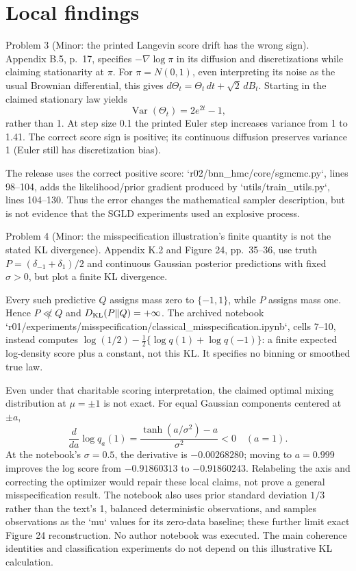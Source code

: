 \documentclass[10pt]{article}
\begin{document}
\section*{Local findings}
Problem 3 (Minor: the printed Langevin score drift has the wrong sign).  Appendix B.5, p. 17, specifies \(-\nabla\log\pi\) in its diffusion and discretizations while claiming stationarity at \(\pi\). For \(\pi=N(0,1)\), even interpreting its noise as the usual Brownian differential, this gives \(d\Theta_t=\Theta_t\,dt+\sqrt2\,dB_t\). Starting in the claimed stationary law yields \[\operatorname{Var}(\Theta_t)=2e^{2t}-1,\] rather than 1. At step size 0.1 the printed Euler step increases variance from 1 to 1.41. The correct score sign is positive; its continuous diffusion preserves variance 1 (Euler still has discretization bias).\par
The release uses the correct positive score: `r02/bnn\_hmc/core/sgmcmc.py`, lines 98–104, adds the likelihood/prior gradient produced by `utils/train\_utils.py`, lines 104–130. Thus the error changes the mathematical sampler description, but is not evidence that the SGLD experiments used an explosive process.\par
Problem 4 (Minor: the misspecification illustration’s finite quantity is not the stated KL divergence).  Appendix K.2 and Figure 24, pp. 35–36, use truth \(P=(\delta_{-1}+\delta_1)/2\) and continuous Gaussian posterior predictions with fixed \(\sigma>0\), but plot a finite KL divergence.\par
Every such predictive \(Q\) assigns mass zero to \(\{-1,1\}\), while \(P\) assigns mass one. Hence \(P\not\ll Q\) and \(D_{\rm KL}(P\|Q)=+\infty\). The archived notebook `r01/experiments/misspecification/classical\_misspecification.ipynb`, cells 7–10, instead computes \(\log(1/2)-\tfrac12\{\log q(1)+\log q(-1)\}\): a finite expected log-density score plus a constant, not this KL. It specifies no binning or smoothed true law.\par
Even under that charitable scoring interpretation, the claimed optimal mixing distribution at \(\mu=\pm1\) is not exact. For equal Gaussian components centered at \(\pm a\), \[\frac{d}{da}\log q_a(1)
=\frac{\tanh(a/\sigma^2)-a}{\sigma^2}<0\quad(a=1).\] At the notebook’s \(\sigma=0.5\), the derivative is \(-0.00268280\); moving to \(a=0.999\) improves the log score from \(-0.91860313\) to \(-0.91860243\). Relabeling the axis and correcting the optimizer would repair these local claims, not prove a general misspecification result. The notebook also uses prior standard deviation \(1/3\) rather than the text’s 1, balanced deterministic observations, and samples observations as the `mu` values for its zero-data baseline; these further limit exact Figure 24 reconstruction. No author notebook was executed. The main coherence identities and classification experiments do not depend on this illustrative KL calculation.\par
\end{document}

